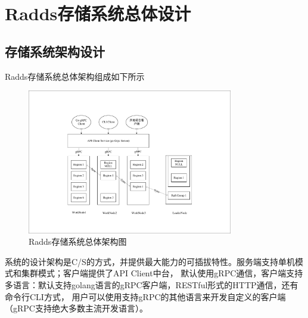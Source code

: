 \section{Radds存储系统总体设计}

	
	
	\subsection{存储系统架构设计}

	Radds存储系统总体架构组成如下所示
	
	\begin{figure}[H]
		\centering
		\includegraphics[width=0.80\textwidth]{pdf/radds_system_arch.pdf}
		\caption{Radds存储系统总体架构图}
		\label{overall_structure}
	\end{figure}

		系统的设计架构是C/S的方式，并提供最大能力的可插拔特性。服务端支持单机模式和集群模式；客户端提供了API Client中台，
		默认使用gRPC通信，客户端支持多语言：默认支持golang语言的gRPC客户端，RESTful形式的HTTP通信，还有命令行CLI方式，
		用户可以使用支持gRPC的其他语言来开发自定义的客户端（gRPC支持绝大多数主流开发语言）。
		
